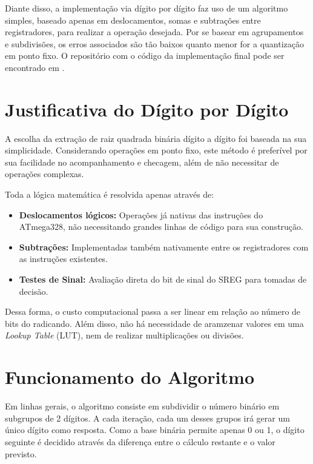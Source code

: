 \documentclass[conference]{IEEEtran}
\begin{document}
Diante disso, a implementação via dígito por dígito faz uso de um algoritmo simples, baseado apenas em deslocamentos, somas e subtrações entre registradores, para realizar a operação desejada. Por se basear em agrupamentos e subdivisões, os erros associados são tão baixos quanto menor for a quantização em ponto fixo. O repositório com o código da implementação final pode ser encontrado em \cite{monteiro_sismicro}.

\section{Justificativa do Dígito por Dígito}
A escolha da extração de raiz quadrada binária dígito a dígito foi baseada na sua simplicidade. Considerando operações em ponto fixo, este método é preferível por sua facilidade no acompanhamento e checagem, além de não necessitar de operações complexas.

Toda a lógica matemática é resolvida apenas através de:
\begin{itemize}
    \item \textbf{Deslocamentos lógicos:} Operações já nativas das instruções do ATmega328, não necessitando grandes linhas de código para sua construção.
    \item \textbf{Subtrações:} Implementadas também nativamente entre os registradores com as instruções existentes.
    \item \textbf{Testes de Sinal:} Avaliação direta do bit de sinal do SREG para tomadas de decisão.
\end{itemize}

Dessa forma, o custo computacional passa a ser linear em relação ao número de bits do radicando. Além disso, não há necessidade de aramzenar valores em uma \textit{Lookup Table} (LUT), nem de realizar multiplicações ou divisões.

\section{Funcionamento do Algoritmo}
Em linhas gerais, o algoritmo consiste em subdividir o número binário em subgrupos de 2 dígitos. A cada iteração, cada um desses grupos irá gerar um único dígito como resposta. Como a base binária permite apenas 0 ou 1, o dígito seguinte é decidido através da diferença entre o cálculo restante e o valor previsto.
\end{document}
